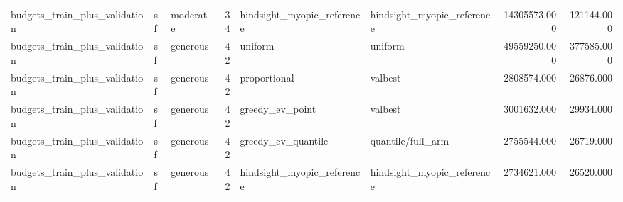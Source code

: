 \begin{tabular}{lllrllrr}
budgets\_train\_plus\_validation & sf & moderate & 34 & hindsight\_myopic\_reference & hindsight\_myopic\_reference & 14305573.000 & 121144.000 \\
budgets\_train\_plus\_validation & sf & generous & 42 & uniform & uniform & 49559250.000 & 377585.000 \\
budgets\_train\_plus\_validation & sf & generous & 42 & proportional & valbest & 2808574.000 & 26876.000 \\
budgets\_train\_plus\_validation & sf & generous & 42 & greedy\_ev\_point & valbest & 3001632.000 & 29934.000 \\
budgets\_train\_plus\_validation & sf & generous & 42 & greedy\_ev\_quantile & quantile/full\_arm & 2755544.000 & 26719.000 \\
budgets\_train\_plus\_validation & sf & generous & 42 & hindsight\_myopic\_reference & hindsight\_myopic\_reference & 2734621.000 & 26520.000 \\
\bottomrule
\end{tabular}
